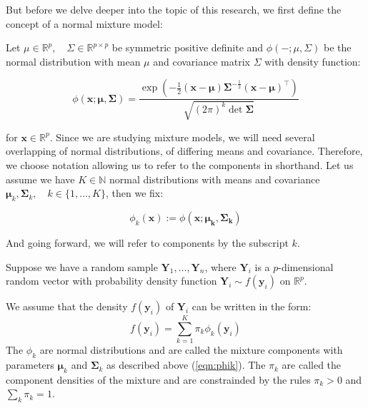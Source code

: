 But before we delve deeper into the topic of this research, we first define the
concept of a normal mixture model:

Let $ \mu \in \mathbb{R}^p , \quad \Sigma \in \mathbb{R}^{p \times p} $ be
symmetric positive definite and $ \phi(- ; \mu, \Sigma) $ be the normal 
distribution with mean $ \mu $ and covariance matrix $ \Sigma $ with density 
function:

\begin{equation} 
    \phi(\pmb{x;\mu,\Sigma})=
    \frac{\exp(-\frac{1}{2}(\pmb{x-\mu})\pmb{\Sigma}^{-\frac{1}{2}}(\pmb{x-\mu})^\top)}
         {\sqrt{(2\pi)^k \det{\pmb{\Sigma}}}}  
\end{equation}

for $\pmb{x} \in \mathbb{R}^p$.
Since we are studying mixture models, we will need several overlapping of 
normal distributions, of differing means and covariance. Therefore, we choose
notation allowing us to refer to the components in shorthand. Let us assume we
have $K \in \mathbb{N}$ normal distributions with means and covariance 
$\pmb{\mu}_k, \pmb{\Sigma}_k,\quad k \in \{1, \dots , K\}$, then we fix:

\begin{equation} 
    \phi_k(\pmb{x}) := \phi(\pmb{x;\mu_k, \Sigma_k})
    \label{eqn:phik}
\end{equation}

And going forward, we will refer to components by the subscript $k$.


\begin{definition}
    Suppose we have a random sample $ \pmb{Y}_1, \dots , \pmb{Y}_n $, where
    $\pmb{Y}_i$ is a $p$-dimensional random vector with probability density 
    function $ \pmb{Y}_i \sim f(\pmb{y}_i) $ on $\mathbb{R}^p$.

    We assume that the density $ f(\pmb{y}_i) $ of $ \pmb{Y}_i $ can 
    be written in the form: 
    \begin{equation} 
        f(\pmb{y}_i) = \sum_{k=1}^{K} \pi_k \phi_k (\pmb{y}_i)
        \label{eqn:mixture}
    \end{equation}
    The $\phi_k$ are normal distributions and are called the mixture components
    with parameters $\pmb{\mu}_k$ and $\pmb{\Sigma}_k$ as described above 
    (\ref{eqn:phik}).
    The $ \pi_k $ are called the component densities of the mixture and are
    constrainded by the rules $\pi_k > 0$ and $\sum_k \pi_k = 1$.

\end{definition}

